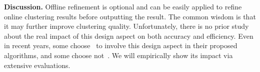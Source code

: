 
\textbf{Discussion.}
Offline refinement is optional and can be easily applied to refine online clustering results before outputting the result. The common wisdom is that it may further improve clustering quality.
Unfortunately, there is no prior study about the real impact of this design aspect on both accuracy and efficiency. Even in recent years, some choose~\cite{StreamKM++:12} to involve this design aspect in their proposed \dsc algorithms, and some choose not~\cite{EDMStream:17}. We will empirically show its impact via extensive evaluations.

